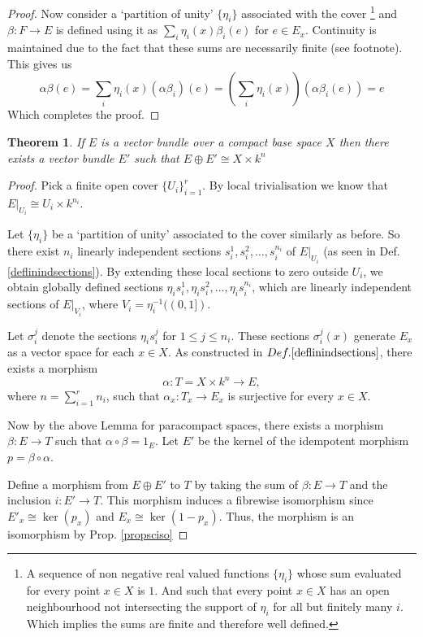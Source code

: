\documentclass[12pt]{article}
\numberwithin{equation}{section}
\newcounter{dummy} \numberwithin{dummy}{section}
\newtheorem{theorem}[dummy]{Theorem}
\begin{document}
\begin{proof}
		Now consider a `partition of unity' $\{ \eta_i\}$ associated with the cover \footnote{A sequence of non negative real valued functions $\{\eta_i \}$ whose sum evaluated for every point $x \in X$ is $1$. And such that every point $x\in X$ has an open neighbourhood not intersecting the support of $\eta_i $ for all but finitely many $i$. Which implies the sums are finite and therefore well defined.} and $\beta:F \to E$ is defined using it as $\sum_{i} \eta_i(x)\beta_i(e)$ for $e\in E_x$. Continuity is maintained due to the fact that these sums are necessarily finite (see footnote). This gives us \[ \alpha \beta (e)= \sum_i \eta_i(x) (\alpha \beta_i) (e) = (\sum_i \eta_i(x)) (\alpha \beta_i (e)) = e \]
		Which completes the proof.
	\end{proof}
	
	\begin{theorem}\label{stablytrivialcompact}
		If $E$ is a vector bundle over a compact base space $X$ then there exists a vector bundle $E'$ such that $E \oplus E' \cong X \times k^n$
	\end{theorem}
	\begin{proof}
		Pick a finite open cover \( \{ U_i \}_{i=1}^r \). By local trivialisation we know that \( E|_{U_i} \cong U_i \times k^{n_i} \). 
		
		Let \( \{\eta_i\} \) be a `partition of unity' associated to the cover similarly as before. So there exist \( n_i \) linearly independent sections \( s_i^1, s_i^2, \dots, s_i^{n_i} \) of \( E|_{U_i} \) (as seen in Def. \ref{deflinindsections}). By extending these local sections to zero outside \( U_i \), we obtain globally defined sections \( \eta_i s_i^1, \eta_i s_i^2, \dots, \eta_i s_i^{n_i} \), which are linearly independent sections of \( E|_{V_i} \), where \( V_i = \eta_i^{-1}((0,1]) \).
		
		Let \( \sigma_i^j \) denote the sections \( \eta_i s_i^j \) for \( 1 \leq j \leq n_i \). These sections \( \sigma_i^j(x) \) generate \( E_x \) as a vector space for each \( x \in X \). As constructed in $Def. \ref{deflinindsections}$, there exists a morphism
		\[
		\alpha: T = X \times k^n \to E,
		\]
		where \( n = \sum_{i=1}^r n_i \), such that \( \alpha_x: T_x \to E_x \) is surjective for every \( x \in X \).
		
		Now by the above Lemma for paracompact spaces, there exists a morphism \( \beta: E \to T \) such that \( \alpha \circ \beta = 1_E \). Let \( E' \) be the kernel of the idempotent morphism \( p = \beta \circ \alpha \). 
		
		Define a morphism from \( E \oplus E' \) to \( T \) by taking the sum of $\beta: E\to T $ and the inclusion $i: E' \to T$. This morphism induces a fibrewise isomorphism since \( E'_x \cong \ker(p_x) \) and \( E_x \cong \ker(1-p_x) \). Thus, the morphism is an isomorphism by Prop. \ref{propsciso}	
	\end{proof}
	
\end{document}
